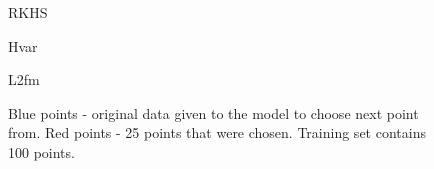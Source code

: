 \documentclass[a4paper]{article}
\begin{document}
\begin{figure}[h]
\begin{minipage}[h]{0.49\linewidth}
\end{minipage}
\hfill
\begin{minipage}[h]{0.49\linewidth}
 RKHS
\end{minipage}
\vfill
\begin{minipage}[h]{0.49\linewidth}
 Hvar
\end{minipage}
\hfill
\begin{minipage}[h]{0.49\linewidth}
 L2fm
\end{minipage}
\caption{Blue points - original data given to the model to choose next point from. Red points - 25 points that were chosen. Training set contains 100 points.}
\label{scoreplots}
\end{figure}
\end{document}

